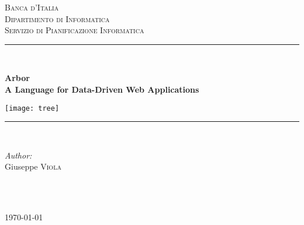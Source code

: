 \documentclass[12pt]{article} %
\newcommand{\A}{Arbor}
\begin{document}
\begin{titlepage}

\newcommand{\HsRule}{\rule{\linewidth}{0.5mm}} %

\center %

\textsc{\LARGE Banca d'Italia}\\[1.5cm] %
\textsc{\Large Dipartimento di Informatica}\\[0.5cm] %
\textsc{\large Servizio di Pianificazione Informatica}\\[0.5cm] %

\HsRule \\[0.4cm]
{ \huge \bfseries \A{} \\
\normalsize A Language for Data-Driven Web Applications
\begin{center}
\texttt{[image: tree]}
\end{center}
}%
\HsRule \\[1.5cm]

\begin{minipage}{0.4\textwidth}
\begin{flushleft} \large
\emph{Author:}\\
Giuseppe \textsc{Viola} %
\end{flushleft}
\end{minipage}
~
\begin{minipage}{0.4\textwidth}
\begin{flushright} \large
\end{flushright}
\end{minipage}\\[3cm]

{\large \today}\\[3cm] %


\vfill %

\end{titlepage}
\end{document}
